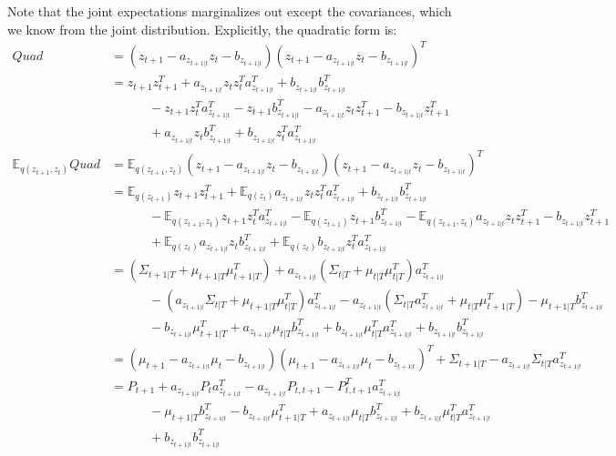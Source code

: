 \documentclass[11pt, reqno]{article}
\numberwithin{equation}{section}
\begin{document}
Note that the joint expectations marginalizes out except the covariances, which we know from the joint distribution. Explicitly, the quadratic form is: 
\begin{align*}
Quad &= (z_{t+1} - a_{z_{t+1|t}}z_t -b_{z_{t+1|t}})(z_{t+1} - a_{z_{t+1|t}}z_t -b_{z_{t+1|t}})^T \\
&= z_{t+1}z_{t+1}^T + a_{z_{t+1|t}}z_tz_t^Ta_{z_{t+1|t}}^T + b_{z_{t+1|t}}b_{z_{t+1|t}}^T \\ 
&\hspace{3em} - z_{t+1}z_{t}^T a_{z_{t+1|t}}^T - z_{t+1}b_{z_{t+1|t}}^T - a_{z_{t+1|t}}z_{t}z_{t+1}^T - b_{z_{t+1|t}}z_{t+1}^T\\
&\hspace{3em} + a_{z_{t+1|t}}z_{t}b_{z_{t+1|t}}^T  + b_{z_{t+1|t}}z_{t}^T a_{z_{t+1|t}}^T  \\
\mathbb{E}_{q(z_{t+1}, z_t)} Quad
&= \mathbb{E}_{q(z_{t+1}, z_t)} (z_{t+1} - a_{z_{t+1|t}}z_t -b_{z_{t+1|t}})(z_{t+1} - a_{z_{t+1|t}}z_t -b_{z_{t+1|t}})^T \\
&= \mathbb{E}_{q(z_{t+1})}z_{t+1}z_{t+1}^T + \mathbb{E}_{q(z_{t})}a_{z_{t+1|t}}z_tz_t^Ta_{z_{t+1|t}}^T + b_{z_{t+1|t}}b_{z_{t+1|t}}^T \\ 
&\hspace{3em} -  \mathbb{E}_{q(z_{t+1},z_t)} z_{t+1}z_{t}^T a_{z_{t+1|t}}^T - \mathbb{E}_{q(z_{t+1})}z_{t+1}b_{z_{t+1|t}}^T - \mathbb{E}_{q(z_{t+1},z_t)}a_{z_{t+1|t}}z_{t}z_{t+1}^T - b_{z_{t+1|t}}z_{t+1}^T\\
&\hspace{3em} + \mathbb{E}_{q(z_t)} a_{z_{t+1|t}}z_{t}b_{z_{t+1|t}}^T  + \mathbb{E}_{q(z_t)} b_{z_{t+1|t}}z_{t}^T a_{z_{t+1|t}}^T  \\
&= (\Sigma_{t+1|T}+\mu_{t+1|T}\mu_{t+1|T}^T) + a_{z_{t+1|t}}(\Sigma_{t|T} + \mu_{t|T}\mu_{t|T}^T)a_{z_{t+1|t}}^T \\ 
&\hspace{3em} - (a_{z_{t+1|t}}\Sigma_{t|T} + \mu_{t+1|T}\mu_{t|T}^T)a_{z_{t+1|t}}^T - a_{z_{t+1|t}}(\Sigma_{t|T}a_{z_{t+1|t}}^T + \mu_{t|T}\mu_{t+1|T}^T) - \mu_{t+1|T}b_{z_{t+1|t}}^T \\
&\hspace{3em} - b_{z_{t+1|t}}\mu_{t+1|T}^T + a_{z_{t+1|t}}\mu_{t|T}b_{z_{t+1|t}}^T  + b_{z_{t+1|t}}\mu_{t|T}^T a_{z_{t+1|t}}^T  + b_{z_{t+1|t}}b_{z_{t+1|t}}^T \\
&= (\mu_{t+1} - a_{z_{t+1|t}}\mu_t - b_{z_{t+1|t}})(\mu_{t+1} - a_{z_{t+1|t}}\mu_t - b_{z_{t+1|t}})^T + \Sigma_{t+1|T} - a_{z_{t+1|t}}\Sigma_{t|T}a_{z_{t+1|t}}^T \\ 
&= P_{t+1} + a_{z_{t+1|t}}P_{t}a_{z_{t+1|t}}^T  - a_{z_{t+1|t}}P_{t,t+1} - P_{t,t+1}^T a_{z_{t+1|t}}^T \\
&\hspace{3em} - \mu_{t+1|T}b_{z_{t+1|t}}^T - b_{z_{t+1|t}}\mu_{t+1|T}^T  + a_{z_{t+1|t}}\mu_{t|T}b_{z_{t+1|t}}^T  + b_{z_{t+1|t}}\mu_{t|T}^T a_{z_{t+1|t}}^T  \\
&\hspace{3em} + b_{z_{t+1|t}}b_{z_{t+1|t}}^T \\
\end{align*}
\end{document}

